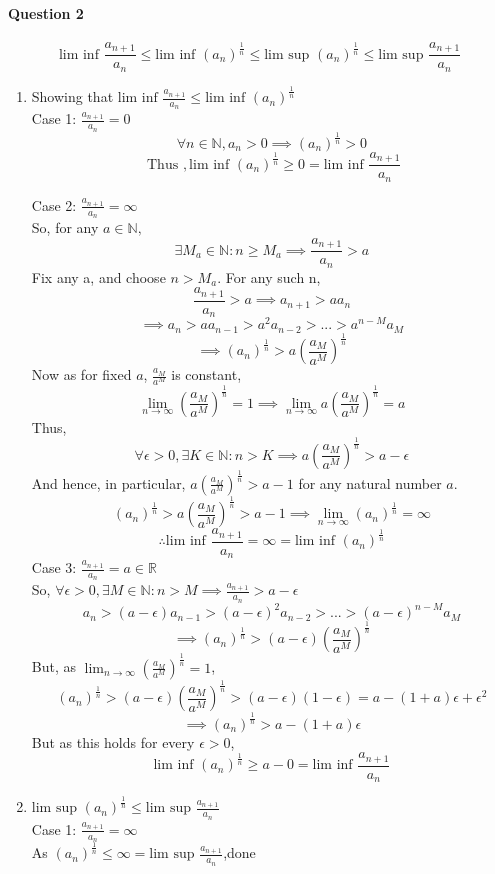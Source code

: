 \documentclass[20pt]{extarticle} %
\begin{document}
\paragraph{Question 2}
\[ \text{lim inf } \frac{a_{n+1}}{a_n} \leq \text{lim inf }(a_n)^\frac{1}{n} \leq \text{lim sup }(a_n)^\frac{1}{n} \leq \text{lim sup }\frac{a_{n+1}}{a_n} \]
\begin{enumerate}[label=\Roman*]
	\item Showing that $\text{lim inf } \frac{a_{n+1}}{a_n} \leq \text{lim inf }(a_n)^\frac{1}{n}$\\
		Case 1:  $ \frac{a_{n+1}}{a_n}=0 $
		\[ \forall n \in \mathbb{N}, a_n > 0 \implies (a_n)^ \frac{1}{n}> 0 \]
		\[ \text{ Thus } , \text{lim inf }(a_n)^ \frac{1}{n} \geq 0 = \text{lim inf } \frac{a_{n+1}}{a_n} 	 \]

		Case 2:  $ \frac{a_{n+1}}{a_n}= \infty $\\
		So, for any $ a \in \mathbb{N},$
		\[ \exists M_a \in \mathbb{N}: n\geq	M_a \implies \frac{a_{n+1}}{a_n}> a \]
		Fix any a, and choose $n>M_a$. For any such n,
		\[  \frac{a_{n+1}}{a_n}>a \implies a_{n+1} >aa_n  \]
		\[ \implies a_n>aa_{n-1}> a^2a_{n-2}>...>a^{n-M}a_M \]
		\[ \implies  (a_n)^ \frac{1}{n} > a( \frac{a_M}{a^M} )^	\frac{1}{n} \]
		Now as for fixed $a$, $ \frac{a_M}{a^M} $ is constant,
		\[ \lim_{n \to \infty} (\frac{a_M}{a^M})^{ \frac{1}{n} }=1 \implies \lim_{n \to \infty} a(\frac{a_M}{a^M})^{ \frac{1}{n} }=a\]
		Thus, \[\forall \epsilon >0, \exists K \in \mathbb{N}: n>K \implies a(\frac{a_M}{a^M})^{ \frac{1}{n} }>a- \epsilon \]
		And hence, in particular, $a(\frac{a_M}{a^M})^{ \frac{1}{n} }>a-1$ for any natural number $a$.
		\[ (a_n)^ \frac{1}{n}  > a(\frac{a_M}{a^M})^{ \frac{1}{n} }> a-1 \implies \lim_{n \to \infty} (a_n)^ \frac{1}{n}= \infty  \]
		\[ \therefore  \text{lim inf } \frac{a_{n+1}}{a_n} = \infty=\text{lim inf }(a_n)^\frac{1}{n}\]
		Case 3:  $ \frac{a_{n+1}}{a_n}= a \in \mathbb{R} $\\
		So, $ \forall \epsilon > 0,  \exists M \in \mathbb{N}: n > M \implies \frac{a_{n+1}}{a_n} > a-\epsilon$
		\[ a_n>(a-\epsilon) a_{n-1}>(a-\epsilon)^2 a_{n-2}>...>(a-\epsilon)^{n-M} a_M \]
		\[ \implies (a_n)^ \frac{1}{n}>(a- \epsilon) (\frac{a_M}{a^M})^{ \frac{1}{n} }\]
	But, as $\lim_{n \to \infty} (\frac{a_M}{a^M})^ \frac{1}{n}=1 $,\\
	\[ (a_n)^ \frac{1}{n}>(a- \epsilon) (\frac{a_M}{a^M})^{ \frac{1}{n} }>(a-\epsilon)(1-\epsilon)=a-(1+a)\epsilon+ \epsilon^2 \]
	\[ \implies  (a_n)^ \frac{1}{n}>a-(1+a)\epsilon \]
		But as this holds for every $\epsilon >0$,
		\[ \text{lim inf }(a_n)^ \frac{1}{n} \geq a-0= \text{lim inf } \frac{a_{n+1}}{a_n}  \]
\newpage
	\item  $\text{lim sup }(a_n)^\frac{1}{n} \leq \text{lim sup }\frac{a_{n+1}}{a_n}$\\
		Case 1:  $ \frac{a_{n+1}}{a_n}=\infty $\\
		As $(a_n)^ \frac{1}{n} \leq \infty = \text{lim sup }\frac{a_{n+1}}{a_n}$,done\\


\end{enumerate}
\end{document}
